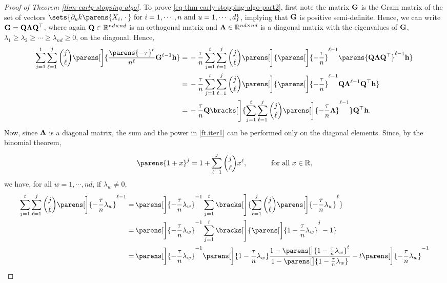 \begin{proof}[Proof of Theorem \ref{thm-early-stopping-algo}]
	To prove \eqref{eq-thm-early-stopping-algo-part2}, first note the matrix $\mathbf{G}$ is the Gram matrix of the set of vectors $\sets{\partial_u k \parens{X_i, \,\cdot\,} \text{ for } i = 1, \cdots, n \text{ and } u = 1, \cdots, d}$, implying that $\mathbf{G}$ is positive semi-definite. Hence, we can write $\mathbf{G} = \mathbf{Q} \boldsymbol{\Lambda} \mathbf{Q}^{\top}$, where again $\mathbf{Q} \in \mathbb{R}^{nd \times nd}$ is an orthogonal matrix and $\boldsymbol{\Lambda} \in \mathbb{R}^{nd \times nd}$ is a diagonal matrix with the eigenvalues of $\mathbf{G}$, $\lambda_1 \ge \lambda_2 \ge \cdots \ge \lambda_{nd} \ge 0$, on the diagonal. Hence, 
	\begin{align}
		\sum_{j=1}^t \sum_{\ell=1}^j {j \choose \ell} \parens[\bigg]{\frac{\parens{-\tau}^{\ell}}{n^{\ell}} \bG^{\ell-1} \bh}  \nonumber
		= & \, - \frac{\tau}{n} \sum_{j=1}^t \sum_{\ell=1}^j {j \choose \ell} \parens[\bigg]{\parens[\bigg]{- \frac{\tau}{n}}^{\ell-1} \parens{\bQ \bLambda \bQ^\top}^{\ell-1} \bh} \nonumber \\ 
		= & \, - \frac{\tau}{n} \sum_{j=1}^t \sum_{\ell=1}^j {j \choose \ell} \parens[\bigg]{\parens[\bigg]{- \frac{\tau}{n}}^{\ell-1} \bQ \bLambda^{\ell-1} \bQ^\top \bh} \nonumber \\ 
		= & \, - \frac{\tau}{n} \bQ \bracks[\Bigg]{\sum_{j=1}^t \sum_{\ell=1}^j {j \choose \ell} \parens[\bigg]{- \frac{\tau}{n} \bLambda}^{\ell-1}} \bQ^\top \bh. \label{ft.iter1}
	\end{align}
	Now, since $\boldsymbol{\Lambda}$ is a diagonal matrix, the sum and the power in \eqref{ft.iter1} can be performed only on the diagonal elements. Since, by the binomial theorem, 
	\begin{align*}
		\parens{1 + x}^j = 1 + \sum_{\ell=1}^j {j \choose \ell} x^{\ell}, \qquad \quad \text{ for all } x \in \Real, 
	\end{align*}
	we have, for all $w = 1, \cdots, nd$, if $\lambda_w \neq 0$, 
	\begin{align*}
		\sum_{j=1}^t \sum_{\ell=1}^j {j \choose \ell} \parens[\bigg]{- \frac{\tau}{n} \lambda_{w}}^{\ell-1} = & \, \parens[\bigg]{- \frac{\tau}{n} \lambda_{w}}^{-1} \sum_{j=1}^t \bracks[\Bigg]{\sum_{\ell=1}^j {j \choose \ell} \parens[\bigg]{- \frac{\tau}{n} \lambda_{w}}^{\ell}} \nonumber \\ 
		= & \, \parens[\bigg]{- \frac{\tau}{n} \lambda_{w}}^{-1} \sum_{j=1}^t \bracks[\Bigg]{\parens[\bigg]{1 - \frac{\tau}{n} \lambda_{w}}^j - 1} \nonumber \\ 
		= & \, \parens[\bigg]{- \frac{\tau}{n} \lambda_{w}}^{-1} \parens[\bigg]{1 - \frac{\tau}{n} \lambda_{w}} \frac{1 - \parens[\big]{1 - \frac{\tau}{n} \lambda_{w}}^t}{1 - \parens[\big]{1 - \frac{\tau}{n} \lambda_{w}}} - t \parens[\bigg]{- \frac{\tau}{n} \lambda_{w}}^{-1} \nonumber \\ 

\end{align*}
\end{proof}
